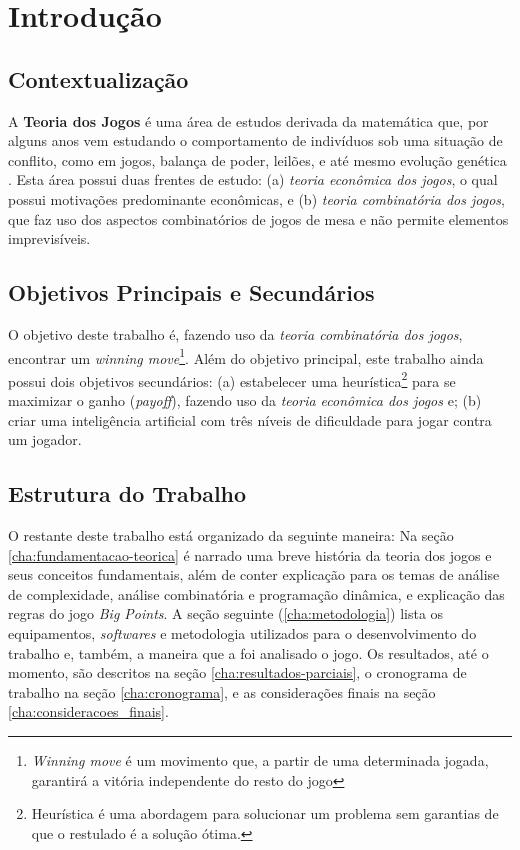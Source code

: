 \chapter[Introdução]{Introdução}
\label{introduc}

\section{Contextualização}

A \textbf{Teoria dos Jogos} é uma área de estudos derivada da matemática que, por alguns anos vem estudando o comportamento de indivíduos sob uma situação de conflito, como em jogos, balança de poder, leilões, e até mesmo evolução genética \cite{sartini_IIbienaldasbm}. Esta área possui duas frentes de estudo: (a) \emph{teoria econômica dos jogos}, o qual possui motivações predominante econômicas, e (b) \emph{teoria combinatória dos jogos}, que faz uso dos aspectos combinatórios de jogos de mesa e não permite elementos imprevisíveis.

\section{Objetivos Principais e Secundários}

O objetivo deste trabalho é, fazendo uso da \emph{teoria combinatória dos jogos}, encontrar um \emph{winning move}\footnote{\emph{Winning move} é um movimento que, a partir de uma determinada jogada, garantirá a vitória independente do resto do jogo}. Além do objetivo principal, este trabalho ainda possui dois objetivos secundários: (a) estabelecer uma heurística\footnote{Heurística é uma abordagem para solucionar um problema sem garantias de que o restulado é a solução ótima.} para se maximizar o ganho (\emph{payoff}), fazendo uso da \emph{teoria econômica dos jogos} e; (b) criar uma inteligência artificial com três níveis de dificuldade para jogar contra um jogador.

\section{Estrutura do Trabalho}

O restante deste trabalho está organizado da seguinte maneira: Na seção \ref{cha:fundamentacao-teorica} é narrado uma breve história da teoria dos jogos e seus conceitos fundamentais, além de conter explicação para os temas de análise de complexidade, análise combinatória e programação dinâmica, e explicação das regras do jogo \emph{Big Points}. A seção seguinte (\ref{cha:metodologia}) lista os equipamentos, \textit{softwares} e metodologia utilizados para o desenvolvimento do trabalho e, também, a maneira que a foi analisado o jogo. Os resultados, até o momento, são descritos na seção \ref{cha:resultados-parciais}, o cronograma de trabalho na seção \ref{cha:cronograma}, e as considerações finais na seção \ref{cha:consideracoes_finais}.
